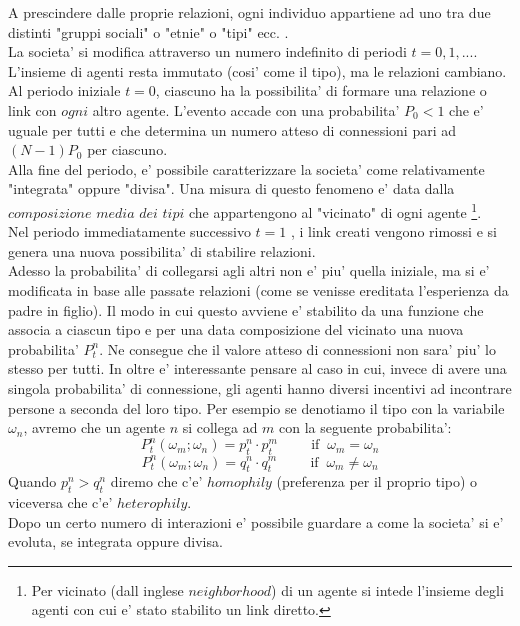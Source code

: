 \documentclass[12pt,titlepage]{article}
\begin{document}
A prescindere dalle proprie relazioni, ogni individuo appartiene ad uno tra due distinti "gruppi sociali" o "etnie" o "tipi" ecc. .\\ 
La societa' si modifica attraverso un numero indefinito di periodi $t=0,1,...$. L'insieme di agenti resta immutato (cosi' come il tipo), ma le relazioni cambiano. Al periodo iniziale $t=0$, ciascuno ha la possibilita' di formare una relazione o link con $ogni$ altro agente. L'evento accade con una probabilita' $P_0 < 1$ che e' uguale per tutti e che determina un numero atteso di connessioni pari ad $(N-1) P_0$ per ciascuno.\\
Alla fine del periodo, e' possibile caratterizzare la societa' come relativamente "integrata" oppure "divisa". Una misura di questo fenomeno e' data dalla $composizione$ $media$ $dei$ $tipi$ che appartengono al "vicinato" di ogni agente \footnote{Per vicinato (dall inglese $neighborhood$) di un agente si intede l'insieme degli agenti con cui e' stato stabilito un link diretto.}. \\
Nel periodo immediatamente successivo $t=1$ , i link creati vengono rimossi e si genera una nuova possibilita' di stabilire relazioni.\\ 
Adesso la probabilita' di collegarsi agli altri non e' piu' quella iniziale, ma si e' modificata in base alle passate relazioni (come se venisse ereditata l'esperienza da padre in figlio). Il modo in cui questo avviene e' stabilito da una funzione che associa a ciascun tipo e  per una data composizione del vicinato una nuova probabilita' $P_t^n$. Ne consegue che il valore atteso di connessioni non sara' piu' lo stesso per tutti.   In oltre e' interessante pensare al caso in cui, invece di avere una singola probabilita' di connessione, gli agenti hanno diversi incentivi ad incontrare persone a seconda del loro tipo. Per esempio se denotiamo il tipo con la variabile $\omega_n$, avremo che un agente $n$ si collega ad $m$ con la seguente probabilita': 
\[
	P_t^n(\omega_m;\omega_n) = p_t^n \cdot p_t^m \hspace{1cm} \text{if} \;\; \omega_m=\omega_n
\]
\[
	P_t^n(\omega_m;\omega_n) = q_t^n \cdot q_t^m\hspace{1cm} \text{if} \;\; \omega_m \neq \omega_n
\]  
Quando $p_t^n > q_t^n$ diremo che c'e' $homophily$ (preferenza per il proprio tipo) o viceversa che c'e' $heterophily$.\\
Dopo un certo numero di interazioni e' possibile guardare a come la societa' si e' evoluta, se integrata oppure divisa.
\end{document}

